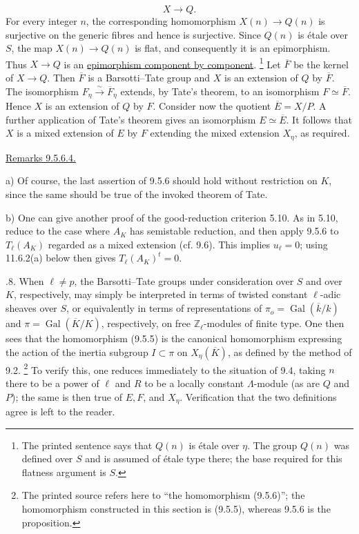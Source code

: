 \begin{equation*}
X\longrightarrow Q.
\end{equation*}
For every integer $n$, the corresponding homomorphism
$X(n)\longrightarrow Q(n)$ is surjective on the generic fibres and hence is
surjective. Since $Q(n)$ is étale over $S$, the map
$X(n)\longrightarrow Q(n)$ is flat, and consequently it is an epimorphism.
Thus $X\longrightarrow Q$ is an \underline{epimorphism component by component}.
\footnote{The printed sentence says that $Q(n)$ is étale over $\eta$.
The group $Q(n)$ was defined over $S$ and is assumed of étale type there;
the base required for this flatness argument is $S$.}
Let $\overline F$ be the kernel of $X\longrightarrow Q$. Then
$\overline F$ is a Barsotti--Tate group and $X$ is an extension of $Q$ by
$\overline F$. The isomorphism
$F_\eta\xrightarrow{\sim}\overline F_\eta$ extends, by Tate's theorem, to
an isomorphism $F\simeq\overline F$. Hence $X$ is an extension of $Q$ by
$F$. Consider now the quotient $\overline E=X/P$. A further application of
Tate's theorem gives an isomorphism $E\simeq\overline E$. It follows that
$X$ is a mixed extension of $E$ by $F$ extending the mixed extension
$X_\eta$, as required.

\medskip
\noindent
\underline{Remarks 9.5.6.4.}

\smallskip
\noindent
a) Of course, the last assertion of 9.5.6 should hold without restriction
on $K$, since the same should be true of the invoked theorem of Tate.

\smallskip
\noindent
b) One can give another proof of the good-reduction criterion 5.10. As in
5.10, reduce to the case where $A_K$ has semistable reduction, and then
apply 9.5.6 to $T_\ell(A_K)$ regarded as a mixed extension (cf. 9.6). This
implies $u_\ell=0$; using 11.6.2(a) below then gives
$T_\ell(A_K)^t=0$.

\medskip
{}.8. When $\ell\neq p$, the Barsotti--Tate groups under consideration
over $S$ and over $K$, respectively, may simply be interpreted in terms of
twisted constant $\ell$-adic sheaves over $S$, or equivalently in terms of
representations of
$\pi_o=\operatorname{Gal}(\overline k/k)$ and
$\pi=\operatorname{Gal}(\overline K/K)$, respectively, on free
$\mathbb Z_\ell$-modules of finite type. One then sees that the homomorphism
(9.5.5) is the canonical homomorphism expressing the action of the inertia
subgroup $I\subset\pi$ on $X_\eta(\overline K)$, as defined by the method
of 9.2.
\footnote{The printed source refers here to ``the homomorphism (9.5.6)'';
the homomorphism constructed in this section is (9.5.5), whereas 9.5.6 is
the proposition.}
To verify this, one reduces immediately to the situation of 9.4, taking
$n$ there to be a power of $\ell$ and $R$ to be a locally constant
$\Lambda$-module (as are $Q$ and $P$); the same is then true of $E,F$, and
$X_\eta$. Verification that the two definitions agree is left to the
reader.
